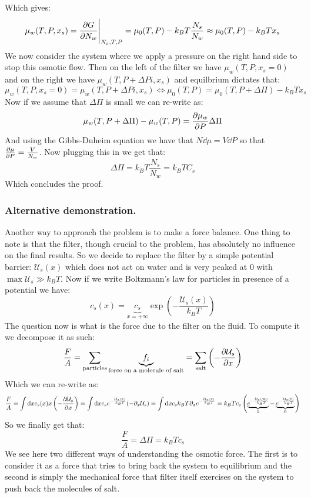 \documentclass[10pt,a4paper]{book}
\begin{document}
Which gives:
\[
\mu_w(T, P, x_s) = \pdv{G}{N_w}\Bigg|_{N_s, T, P} = \mu_0(T, P) - k_B T \frac{N_s}{N_w} \approx \mu_0 (T, P) - k_B T x_s
\]
We now consider the system where we apply a pressure on the right hand side to stop this osmotic flow. Then on the left of the filter we have $\mu_w(T, P, x_s = 0)$ and on the right we have $\mu_w(T, P + \Delta Pi, x_s)$ and equilbrium dictates that:
\[
\mu_w(T, P, x_s = 0) = \mu_w(T, P + \Delta Pi, x_s) \Leftrightarrow \mu_0 (T, P) = \mu_0 (T, P + \Delta \Pi) - k_B T x_s
\]
Now if we assume that $\Delta \Pi$ is small we can re-write as:
\[
\mu_w(T, P + \Delta \Pi) - \mu_w(T, P) = \pdv{\mu_w}{P} \Delta\Pi
\]
And using the Gibbs-Duheim equation we have that $N\dd\mu = V \dd P$ so that $\pdv{\mu}{P} = \frac{V}{N_w}$. Now plugging this in we get that:
\[
\Delta \Pi = k_B T \frac{N_s}{N_w} = k_B T C_s
\]
Which concludes the proof.

\subsubsection{Alternative demonstration.}
Another way to approach the problem is to make a force balance. One thing to note is that the filter, though crucial to the problem, has absolutely no influence on the final results. So we decide to replace the filter by a simple potential barrier: $\mathcal{U}_s(x)$ which does not act on water and is very peaked at 0 with $\max \mathcal{U}_s \gg k_B T$. Now if we write Boltzmann's law for particles in presence of a potential we have:
\[
c_s(x) = \underbrace{c_s}_{x = +\infty} \exp(-\frac{\mathcal{U}_s (x)}{k_B T})
\]
The question now is what is the force due to the filter on the fluid. To compute it we decompose it as such:
\[
\frac{F}{A} = \sum_\text{particles} \underbrace{f_i}_\text{force on a molecule of salt} = \sum_\text{salt} \left(- \pdv{\mathcal{U}_s}{x}\right)
\]
Which we can re-write as:
\[
\frac{F}{A} = \int \dd x c_s(x)x \left(- \pdv{\mathcal{U}_s}{x}\right) = \int \dd x c_s e^{-\frac{\mathcal{U}_s(x)}{k_B T}} (- \partial_x \mathcal{U}_s) = \int \dd x c_s k_B T \partial_x e^{-\frac{\mathcal{U}_s(x)}{k_B T}} = k_B T c_s \left(\underbrace{e^{-\frac{\mathcal{U}_s(\infty)}{k_B T}}}_{1} - \underbrace{e^{-\frac{\mathcal{U}_s(0)}{k_B T}}}_{0}\right)
\]
So we finally get that:
\[
\frac{F}{A} = \Delta \Pi = k_B T c_s
\]
We see here two different ways of understanding the osmotic force. The first is to consider it as a force that tries to bring back the system to equilibrium and the second is simply the mechanical force that filter itself exercises on the system to push back the molecules of salt.
\end{document}
